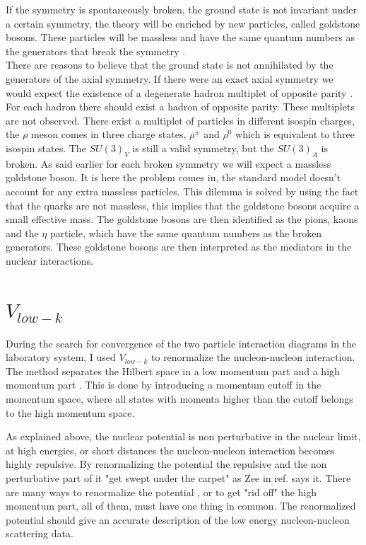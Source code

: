If the symmetry is spontaneously broken, the ground state is not invariant under a certain symmetry, the theory will be enriched by new particles, called
goldstone bosons. These particles will be massless and have the same quantum numbers as the generators that break the symmetry \cite{peskin}.\\
There are reasons to believe that the ground state is not annihilated by the generators of the axial symmetry. If there were an exact axial symmetry we 
would expect the existence of a degenerate hadron multiplet of opposite parity \cite{scherer2005}. For each hadron there should exist a hadron of opposite
parity. These multiplets are not observed. There exist a multiplet of particles in different isospin charges, the $\rho$ meson comes in three charge 
states, $\rho^\pm$ and $\rho^0$ which is equivalent to three isospin states. The $SU(3)_V$ is still a valid symmetry, but the $SU(3)_A$ is broken. 
As said earlier for each broken symmetry we will expect a massless goldstone boson. It is here the problem comes in, the standard
model doesn't account for any extra massless particles. This dilemma is solved by using the fact that the quarks are not massless, this implies that
the goldstone bosons acquire a small effective mass. The goldstone bosons are then identified as the pions, kaons and the $\eta$ particle, which have
the same quantum numbers as the broken generators. 
These goldstone bosons are then interpreted as the mediators in the nuclear interactions.

  


\section{$V_{low-k}$}

During the search for convergence of the two particle interaction diagrams in the laboratory system, I used $V_{low-k}$ to renormalize the 
nucleon-nucleon interaction. The method separates the Hilbert space in a low momentum part and a high momentum part \cite{bogner2003}. This is done by 
introducing a momentum cutoff in the momentum space, where all states with momenta higher than the cutoff belongs to the high momentum space.

As explained above, the nuclear potential is non perturbative in the nuclear limit, at high energies, or short distances the nucleon-nucleon interaction
becomes highly repulsive. By renormalizing the potential the repulsive and the non perturbative part of it "get swept under the carpet" as Zee in ref. \cite{nutshell} says it.%
There are many ways to renormalize the potential , or to get "rid off" the high momentum part, all of them, must have one thing in common. The renormalized
potential should give an accurate description of the low energy nucleon-nucleon scattering data. %

